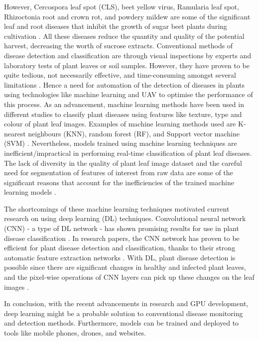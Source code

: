  However, Cercospora leaf spot (CLS), beet yellow virus, Ramularia leaf spot, Rhizoctonia root and crown rot, and powdery mildew are some of the significant leaf and root diseases that inhibit the growth of sugar beet plants during cultivation \cite{ozguven2019automatic, Barreto2020HyperspectralIO}. All these diseases reduce the quantity and quality of the potential harvest, decreasing the worth of sucrose extracts. Conventional methods of disease detection and classification are through visual inspections by experts and laboratory tests of plant leaves or soil samples\cite{yang2018classification}. However, they have proven to be quite tedious, not necessarily effective, and time-consuming amongst several limitations \cite{lu2021review}. Hence a need for automation of the detection of diseases in plants using technologies like machine learning and UAV to optimise the performance of this process.
As an advancement, machine learning methods have been used in different studies to classify plant diseases using features like texture, type and colour of plant leaf images. Examples of machine learning methods used are K-nearest neighbours (KNN), random forest (RF), and Support vector machine (SVM) \cite{Barreto2020HyperspectralIO,sujatha2021performance}. Nevertheless, models trained using machine learning techniques are inefficient/impractical in performing real-time classification of plant leaf diseases. 
The lack of diversity in the quality of plant leaf image dataset and the careful need for segmentation of features of interest from raw data are some of the significant reasons that account for the inefficiencies of the trained machine learning models \cite{arivazhagan2013detection, athanikar2016potato}.

The shortcomings of these machine learning techniques motivated current research on using deep learning (DL) techniques. Convolutional neural network (CNN) - a type of DL network - has shown promising results for use in plant disease classification \cite{kawasaki2015basic}. In research papers, the CNN network has proven to be efficient for plant disease detection and classification, thanks to their strong automatic feature extraction networks \cite{ma2018recognition, ferentinos2018deep}. With DL, plant disease detection is possible since there are significant changes in healthy and infected plant leaves, and the pixel-wise operations of CNN layers can pick up these changes on the leaf images \cite{lu2021review}.

In conclusion, with the recent advancements in research and GPU development, deep learning might be a probable solution to conventional disease monitoring and detection methods. Furthermore, models can be trained and deployed to tools like mobile phones, drones, and websites.

